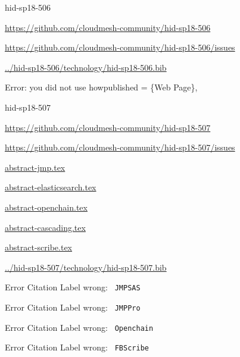 \begin{IU}

hid-sp18-506

\url{https://github.com/cloudmesh-community/hid-sp18-506}

\url{https://github.com/cloudmesh-community/hid-sp18-506/issues}

\href{https://github.com/cloudmesh-community/hid-sp18-506/blob/master//technology/hid-sp18-506.bib}{../hid-sp18-506/technology/hid-sp18-506.bib}

Error: you did not use howpublished = \{Web Page\},

\end{IU}


\begin{IU}

hid-sp18-507

\url{https://github.com/cloudmesh-community/hid-sp18-507}

\url{https://github.com/cloudmesh-community/hid-sp18-507/issues}

\href{https://github.com/cloudmesh-community/hid-sp18-507/blob/master//technology/abstract-jmp.tex}{abstract-jmp.tex}

\href{https://github.com/cloudmesh-community/hid-sp18-507/blob/master//technology/abstract-elasticsearch.tex}{abstract-elasticsearch.tex}

\href{https://github.com/cloudmesh-community/hid-sp18-507/blob/master//technology/abstract-openchain.tex}{abstract-openchain.tex}

\href{https://github.com/cloudmesh-community/hid-sp18-507/blob/master//technology/abstract-cascading.tex}{abstract-cascading.tex}

\href{https://github.com/cloudmesh-community/hid-sp18-507/blob/master//technology/abstract-scribe.tex}{abstract-scribe.tex}

\href{https://github.com/cloudmesh-community/hid-sp18-507/blob/master//technology/hid-sp18-507.bib}{../hid-sp18-507/technology/hid-sp18-507.bib}

 Error Citation Label wrong: \verb| JMPSAS |

 Error Citation Label wrong: \verb| JMPPro |

 Error Citation Label wrong: \verb| Openchain |

 Error Citation Label wrong: \verb| FBScribe |

\end{IU}


